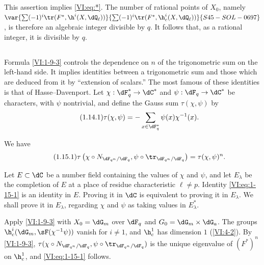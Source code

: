 This assertion implies \eqref{VI:eq:*}. The number of rational points of 
$X_0$, namely $\var{\sum (-1)^i \tr(F^\ast,\h^i(X,\dQ_\ell))}{\sum (-1)^i \tr(F^\ast,\h_c^i(X,\dQ_\ell))}{S45-SOL-0697}$, is therefore an 
algebraic integer divisible by $q$. It follows that, as a rational integer, 
it is divisible by $q$. 





\subsection{}\label{VI:1-14}

Formula \ref{VI:1-9-3} controls the dependence on $n$ of the trigonometric 
sum on the left-hand side. It implies identities between a 
trigonometric sum and those which are deduced from it by ``extension of 
scalars.'' The most famous of these identities is that of 
Hasse--Davenport. Let $\chi:\dF_q^\ast \to \dC^\ast$ and 
$\psi:\dF_q\to \dC^\ast$ be characters, with $\psi$ nontrivial, and 
define the Gauss sum $\tau(\chi,\psi)$ by 
\begin{equation*}\tag{1.14.1}\label{VI:eq:1-14-1}
  \tau(\chi,\psi) = - \sum_{x\in \dF_q^\ast} \psi(x) \chi^{-1}(x) \text{.}
\end{equation*}





\begin{theorem_}\label{VI:1-15}
We have 
\begin{equation*}\tag{1.15.1}\label{VI:eq:1-15-1}
  \tau\left(\chi\circ N_{\dF_{q^n}/\dF_q},\psi\circ \tr_{\dF_{q^n}/\dF_q}\right) = \tau(\chi,\psi)^n \text{.}
\end{equation*}
\end{theorem_}

Let $E\subset \dC$ be a number field containing the values of $\chi$ and 
$\psi$, and let $E_\lambda$ be the completion of $E$ at a place of residue 
characteristic $\ell\ne p$. Identity \eqref{VI:eq:1-15-1} is an identity in 
$E$. Proving it in $\dC$ is equivalent to proving it in $E_\lambda$. We 
shall prove it in $E_\lambda$, regarding $\chi$ and $\psi$ as taking values 
in $E_\lambda^\ast$.

Apply \ref{VI:1-9-3} with $X_0=\dG_m$ over $\dF_q$ and 
$G_0=\dG_m\times \dG_a$. The groups $\h_c^i(\dG_m,\sF(\chi^{-1}\psi))$ vanish for 
$i\ne 1$, and $\h_c^1$ has dimension $1$ (\ref{VI:4-2}). By 
\ref{VI:1-9-3}, 
$\tau(\chi\circ N_{\dF_{q^n}/\dF_q},\psi\circ \tr_{\dF_{q^n}/\dF_q})$ is 
the unique eigenvalue of $(F^\ast)^n$ on $\h_c^1$, and \eqref{VI:eq:1-15-1} 
follows. 

